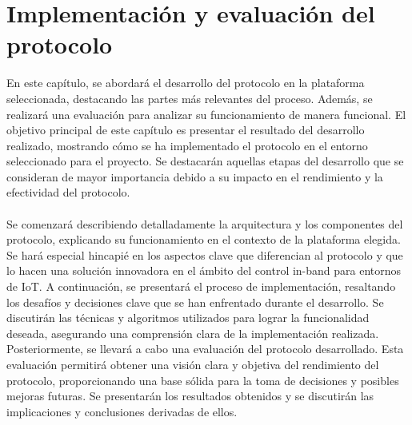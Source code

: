 \chapter{Implementación y evaluación del protocolo}
\label{desarrollo}

En este capítulo, se abordará el desarrollo del protocolo en la plataforma seleccionada, destacando las partes más relevantes del proceso. Además, se realizará una evaluación para analizar su funcionamiento de manera funcional. El objetivo principal de este capítulo es presentar el resultado del desarrollo realizado, mostrando cómo se ha implementado el protocolo en el entorno seleccionado para el proyecto. Se destacarán aquellas etapas del desarrollo que se consideran de mayor importancia debido a su impacto en el rendimiento y la efectividad del protocolo.\\
\\
Se comenzará describiendo detalladamente la arquitectura y los componentes del protocolo, explicando su funcionamiento en el contexto de la plataforma elegida. Se hará especial hincapié en los aspectos clave que diferencian al protocolo y que lo hacen una solución innovadora en el ámbito del control in-band para entornos de IoT. A continuación, se presentará el proceso de implementación, resaltando los desafíos y decisiones clave que se han enfrentado durante el desarrollo. Se discutirán las técnicas y algoritmos utilizados para lograr la funcionalidad deseada, asegurando una comprensión clara de la implementación realizada. Posteriormente, se llevará a cabo una evaluación del protocolo desarrollado. Esta evaluación permitirá obtener una visión clara y objetiva del rendimiento del protocolo, proporcionando una base sólida para la toma de decisiones y posibles mejoras futuras. Se presentarán los resultados obtenidos y se discutirán las implicaciones y conclusiones derivadas de ellos.









